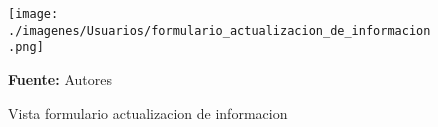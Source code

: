 \begin{figure}[!htb]
  \begin{center}
\texttt{[image: ./imagenes/Usuarios/formulario\_actualizacion\_de\_informacion.png]}
    \caption{Vista formulario actualizacion de informacion}
    \label{fig:Vista_formulario_actualizacion_de_informacion}
    \textbf{Fuente:}  Autores
  \end{center}
\end{figure}
